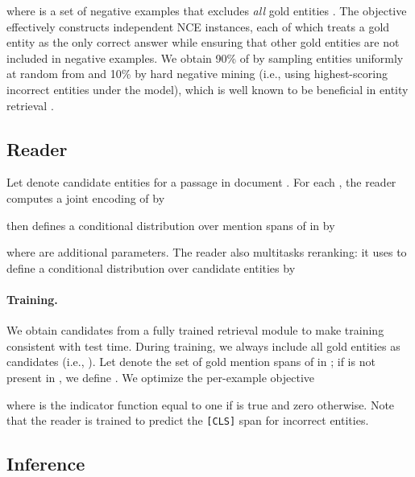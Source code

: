 \documentclass{article} \clearpage{}\usepackage{amsmath,amssymb,amsthm,bbm}
\theoremstyle{definition}
\begin{document}
where  is a set of negative examples that excludes \emph{all} gold entities .
The objective effectively constructs  independent NCE instances, each of which treats a gold entity as the only
correct answer while ensuring that other gold entities are not included in negative examples.
We obtain 90\% of  by sampling entities uniformly at random from 
and 10\% by hard negative mining (i.e., using highest-scoring incorrect entities under the model),
which is well known to be beneficial in entity retrieval \citep{gillick-etal-2019-learning,wu2020scalable,zhang2021understanding}.


\subsection{Reader}
\label{subsec:reader}

Let  denote  candidate entities for a passage  in document .
For each , the reader computes a joint encoding of  by

then defines a conditional distribution over mention spans of  in  by

where  are additional parameters. The reader also multitasks reranking:
it uses  to define a conditional distribution over candidate entities by


\paragraph{Training.}
We obtain candidates   from a fully trained retrieval module to make training consistent with test time.
During training, we always include all gold entities as candidates (i.e., ).
Let  denote the set of gold mention spans of  in ;
if  is not present in , we define .
We optimize the per-example objective

where  is the indicator function equal to one if  is true and zero otherwise.
Note that the reader is trained to predict the \texttt{[CLS]} span for incorrect entities.


\subsection{Inference}
\label{subsec:inference}
\end{document}
